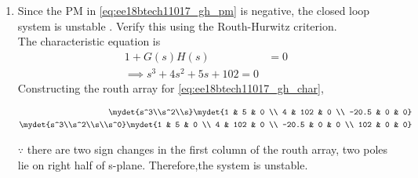 \begin{enumerate}[label=\thesection.\arabic*.,ref=\thesection.\theenumi]
\begin{figure}[!h]
 \caption{}
  \label{fig:ee18btech11017_2}
\end{figure}
%
\item Since the PM in \eqref{eq:ee18btech11017_gh_pm} is negative, the closed loop system is unstable .
Verify this using the Routh-Hurwitz criterion.
%
\\
\solution 
The characteristic equation is 
\begin{align}
1+G(s)H(s)&=0 
\\
\implies s^{3}+4s^{2}+5s+102=0   
\label{eq:ee18btech11017_gh_char}
\end{align}
Constructing the routh array for \eqref{eq:ee18btech11017_gh_char},

\begin{align}
\mydet{s^3\\s^2\\s}
\mydet{1 & 5 & 0 \\ 4 & 102 & 0 \\ -20.5 & 0 & 0}
\\
\mydet{s^3\\s^2\\s\\s^0}
\mydet{1 & 5 & 0 \\ 4 & 102 & 0 \\ -20.5 & 0 & 0 \\ 102 & 0 & 0}
\end{align}

$\because $ there are two sign changes in the first column of the routh array,  two  poles lie on right half of s-plane.  Therefore,the system is unstable.


\end{enumerate}
